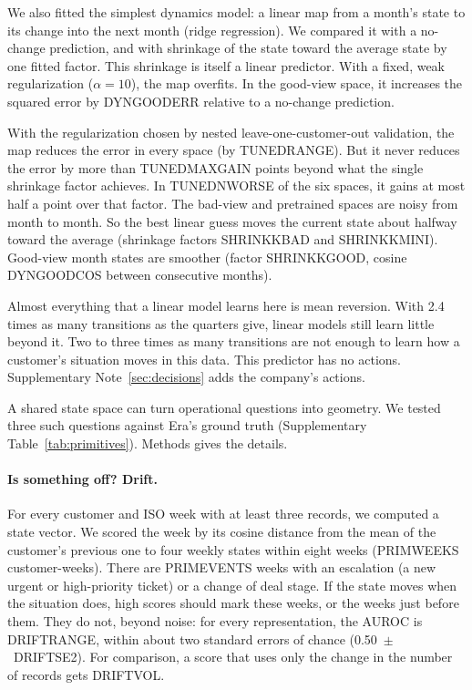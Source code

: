 \documentclass[11pt]{article}
\begin{document}
We also fitted the simplest dynamics model: a linear map from a month's state to its change into the next month (ridge regression). We compared it with a no-change prediction, and with shrinkage of the state toward the average state by one fitted factor. This shrinkage is itself a linear predictor. With a fixed, weak regularization ($\alpha = 10$), the map overfits. In the good-view space, it increases the squared error by DYNGOODERR relative to a no-change prediction.

With the regularization chosen by nested leave-one-customer-out validation, the map reduces the error in every space (by TUNEDRANGE). But it never reduces the error by more than TUNEDMAXGAIN points beyond what the single shrinkage factor achieves. In TUNEDNWORSE of the six spaces, it gains at most half a point over that factor. The bad-view and pretrained spaces are noisy from month to month. So the best linear guess moves the current state about halfway toward the average (shrinkage factors SHRINKKBAD and SHRINKKMINI). Good-view month states are smoother (factor SHRINKKGOOD, cosine DYNGOODCOS between consecutive months).

Almost everything that a linear model learns here is mean reversion. With 2.4 times as many transitions as the quarters give, linear models still learn little beyond it. Two to three times as many transitions are not enough to learn how a customer's situation moves in this data. This predictor has no actions. Supplementary Note~\ref{sec:decisions} adds the company's actions.

A shared state space can turn operational questions into geometry. We tested three such questions against Era's ground truth (Supplementary Table~\ref{tab:primitives}). Methods gives the details.

\paragraph{Is something off? Drift.} For every customer and ISO week with at least three records, we computed a state vector. We scored the week by its cosine distance from the mean of the customer's previous one to four weekly states within eight weeks (PRIMWEEKS customer-weeks). There are PRIMEVENTS weeks with an escalation (a new urgent or high-priority ticket) or a change of deal stage. If the state moves when the situation does, high scores should mark these weeks, or the weeks just before them. They do not, beyond noise: for every representation, the AUROC is DRIFTRANGE, within about two standard errors of chance (0.50~$\pm$~DRIFTSE2). For comparison, a score that uses only the change in the number of records gets DRIFTVOL.
\end{document}
